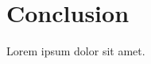 \documentclass[11pt]{article}
\begin{document}
\section{Conclusion}\label{sec:conc}
Lorem ipsum dolor sit amet.
\end{document}
